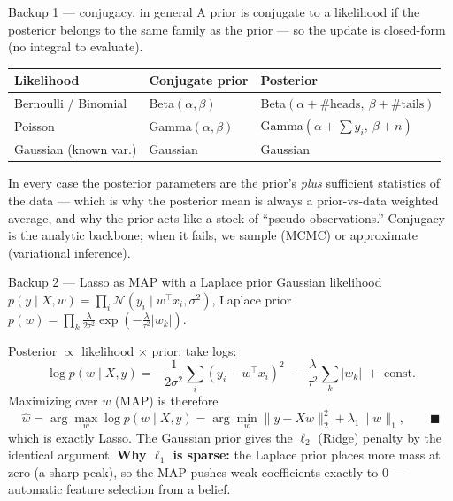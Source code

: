 \documentclass[10pt, aspectratio=169]{beamer}
\begin{document}
\appendix

\begin{frame}{Backup 1 --- conjugacy, in general}
\footnotesize
A prior is \alert{conjugate} to a likelihood if the posterior belongs to the same family as the prior --- so the update is closed-form (no integral to evaluate).
\medskip
\begin{center}\scriptsize\renewcommand{\arraystretch}{1.35}
\begin{tabular}{l|l|l}
\textbf{Likelihood} & \textbf{Conjugate prior} & \textbf{Posterior} \\
\hline
Bernoulli / Binomial & Beta$(\alpha,\beta)$ & Beta$(\alpha + \#\text{heads},\ \beta + \#\text{tails})$ \\
Poisson & Gamma$(\alpha,\beta)$ & Gamma$(\alpha + \sum y_i,\ \beta + n)$ \\
Gaussian (known var.) & Gaussian & Gaussian \\
\end{tabular}
\end{center}
\medskip
In every case the posterior parameters are the prior's \emph{plus} sufficient statistics of the data --- which is why the posterior mean is always a prior-vs-data weighted average, and why the prior acts like a stock of ``pseudo-observations.'' Conjugacy is the analytic backbone; when it fails, we sample (MCMC) or approximate (variational inference).
\end{frame}

\begin{frame}{Backup 2 --- Lasso as MAP with a Laplace prior}
\footnotesize
Gaussian likelihood $p(y\mid X,w) = \prod_i \mathcal{N}(y_i \mid w^\top x_i, \sigma^2)$, Laplace prior $p(w) = \prod_k \tfrac{\lambda}{2\tau^2}\exp(-\tfrac{\lambda}{\tau^2}|w_k|)$.
\medskip

Posterior $\propto$ likelihood $\times$ prior; take logs:
\[
\log p(w\mid X,y) = -\frac{1}{2\sigma^2}\sum_i (y_i - w^\top x_i)^2 \;-\; \frac{\lambda}{\tau^2}\sum_k |w_k| \;+\; \text{const}.
\]
Maximizing over $w$ (MAP) is therefore
\[
\hat w = \arg\max_w \log p(w\mid X,y) = \arg\min_w \|y - Xw\|_2^2 + \lambda_1 \|w\|_1, \qquad \blacksquare
\]
which is exactly Lasso. The Gaussian prior gives the $\ell_2$ (Ridge) penalty by the identical argument. \textbf{Why $\ell_1$ is sparse:} the Laplace prior places more mass at zero (a sharp peak), so the MAP pushes weak coefficients exactly to $0$ --- automatic feature selection from a belief.
\end{frame}
\end{document}
